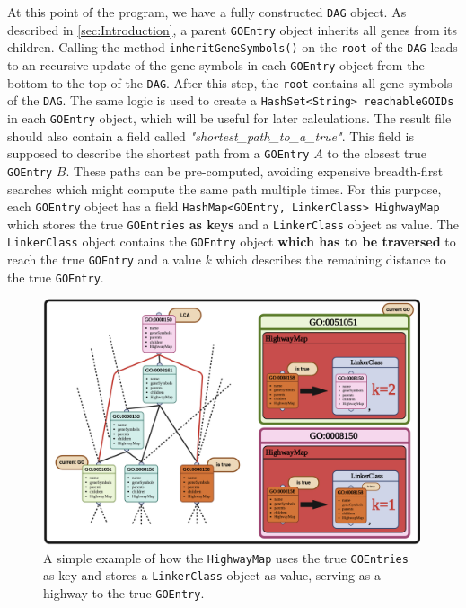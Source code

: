 \documentclass[12pt]{article}
\begin{document}
At this point of the program, we have a fully constructed \texttt{DAG} object.
As described in \ref{sec:Introduction}, a parent \texttt{GOEntry} object
inherits all genes from its children.
Calling the method \texttt{inheritGeneSymbols()} on the \texttt{root} of the \texttt{DAG}
leads to an recursive update of the gene symbols in each \texttt{GOEntry} object
from the bottom to the top of the \texttt{DAG}. After this step, the \texttt{root}
contains all gene symbols of the \texttt{DAG}. The same logic is used to 
create a \texttt{HashSet<String> reachableGOIDs} in each \texttt{GOEntry} object,
which will be useful for later calculations. The result file should also contain
a field called \textit{"shortest\_path\_to\_a\_true"}. This field is supposed to
describe the shortest path from a \texttt{GOEntry} $A$ to the closest true
\texttt{GOEntry} $B$. 
These paths can be pre-computed, avoiding expensive breadth-first searches which
might compute the same path multiple times.
For this purpose, each \texttt{GOEntry} object has a 
field \texttt{HashMap<GOEntry, LinkerClass> HighwayMap} which stores the
true \texttt{GOEntries} \textbf{as keys} and a \texttt{LinkerClass} object as value.
The \texttt{LinkerClass} object contains the \texttt{GOEntry} object
\textbf{which has to be traversed} to reach the true \texttt{GOEntry} and
a value $k$ which describes the remaining distance to the true \texttt{GOEntry}.

\begin{figure}[htpb]
    \centering
    \includegraphics[width=0.99\textwidth]{./figures/Highway.png}
    \caption{A simple example of how the \texttt{HighwayMap} uses the true \texttt{GOEntries} as key and stores a \texttt{LinkerClass} object as value,
    serving as a highway to the true \texttt{GOEntry}.}
    \label{fig:-figures-Highway-png}
\end{figure}
\end{document}
